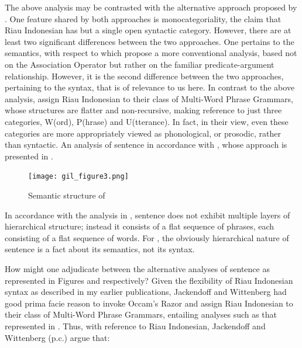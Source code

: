 \documentclass[output=paper,colorlinks,citecolor=brown
]{langscibook}
\begin{document}
The above analysis may be contrasted with the alternative approach proposed by \citet{jackendoff2014syntax,jackendoff2017linear}. One feature shared by both approaches is monocategoriality, the claim that Riau Indonesian has but a single open syntactic category.  However, there are at least two significant differences between the two approaches.  One pertains to the semantics, with respect to which \citet{jackendoff2014syntax,jackendoff2017linear} propose a more conventional analysis, based not on the Association Operator but rather on the familiar predicate-argument relationship.  However, it is the second difference between the two approaches, pertaining to the syntax, that is of relevance to us here.  In contrast to the above analysis, \citet{jackendoff2014syntax,jackendoff2017linear} assign Riau Indonesian to their class of Multi-Word Phrase Grammars, whose structures are flatter and non-recursive, making reference to just three categories, W(ord), P(hrase) and U(tterance).  In fact, in their view, even these categories are more appropriately viewed as phonological, or prosodic, rather than syntactic.  An analysis of sentence  in accordance with \citet{jackendoff2014syntax,jackendoff2017linear}, whose approach is presented in .

\begin{figure}
\centering
\texttt{[image: gil\_figure3.png]}
\caption{\label{fig:gil:fig3}Semantic structure of }
\end{figure}

In accordance with the analysis in , sentence  does not exhibit multiple layers of hierarchical structure; instead it consists of a flat sequence of phrases, each consisting of a flat sequence of words.  For \citet{jackendoff2014syntax,jackendoff2017linear}, the obviously hierarchical nature of sentence  is a fact about its semantics, not its syntax.

How might one adjudicate between the alternative analyses of sentence  as represented in Figures  and  respectively?  Given the flexibility of Riau Indonesian syntax as described in my earlier publications, Jackendoff and Wittenberg had good prima facie reason to invoke Occam's Razor and assign Riau Indonesian to their class of Multi-Word Phrase Grammars, entailing analyses such as that represented in .  Thus, with reference to Riau Indonesian, Jackendoff and Wittenberg (p.c.) argue that:
\end{document}
